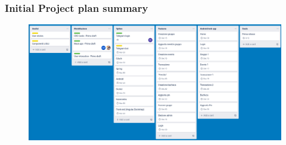 \documentclass[11pt]{beamer}
\begin{document}
	\begin{frame}
		\frametitle{Initial Project plan summary}
		
		\begin{figure}
			\centering
			\includegraphics[width=\linewidth]{img/trello}
		\end{figure}
		

\end{frame}
\end{document}
